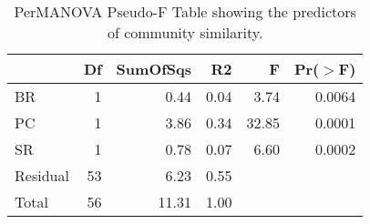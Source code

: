 \begin{table}[ht]
\centering
\begin{tabular}{lrrrrr}
  \hline
 & Df & SumOfSqs & R2 & F & Pr($>$F) \\ 
  \hline
BR & 1 & 0.44 & 0.04 & 3.74 & 0.0064 \\ 
  PC & 1 & 3.86 & 0.34 & 32.85 & 0.0001 \\ 
  SR & 1 & 0.78 & 0.07 & 6.60 & 0.0002 \\ 
  Residual & 53 & 6.23 & 0.55 &  &  \\ 
  Total & 56 & 11.31 & 1.00 &  &  \\ 
   \hline
\end{tabular}
\caption{PerMANOVA Pseudo-F Table showing the predictors of community similarity.} 
\label{tab:com_ng_perm}
\end{table}
